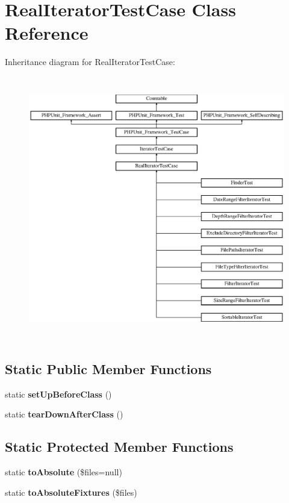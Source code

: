 \section{Real\+Iterator\+Test\+Case Class Reference}
\label{class_symfony_1_1_component_1_1_finder_1_1_tests_1_1_iterator_1_1_real_iterator_test_case}
Inheritance diagram for Real\+Iterator\+Test\+Case\+:\begin{figure}[H]
\begin{center}
\leavevmode
\includegraphics[height=11.563422cm]{class_symfony_1_1_component_1_1_finder_1_1_tests_1_1_iterator_1_1_real_iterator_test_case}
\end{center}
\end{figure}
\subsection*{Static Public Member Functions}
\begin{DoxyCompactItemize}
\item 
static {\bf set\+Up\+Before\+Class} ()
\item 
static {\bf tear\+Down\+After\+Class} ()
\end{DoxyCompactItemize}
\subsection*{Static Protected Member Functions}
\begin{DoxyCompactItemize}
\item 
static {\bf to\+Absolute} (\$files=null)
\item 
static {\bf to\+Absolute\+Fixtures} (\$files)
\end{DoxyCompactItemize}
